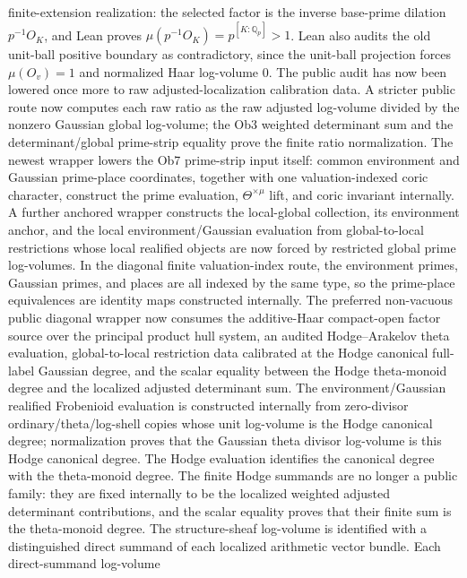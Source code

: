\begin{proposition}
  finite-extension realization: the selected factor is the inverse base-prime
  dilation \(p^{-1}O_K\), and Lean proves
  \(\mu(p^{-1}O_K)=p^{[K:\mathbb Q_p]}>1\).  Lean also audits the old unit-ball
  positive boundary as contradictory, since the unit-ball projection forces
  \(\mu(O_v)=1\) and normalized Haar log-volume \(0\).  The public audit has now
  been lowered once more
  to raw adjusted-localization calibration data.  A stricter public route now
  computes each raw ratio as the raw adjusted log-volume divided by the nonzero
  Gaussian global log-volume; the Ob3 weighted determinant sum and the
  determinant/global prime-strip equality prove the finite ratio normalization.
  The newest wrapper lowers the Ob7 prime-strip input itself: common
  environment and Gaussian prime-place coordinates, together with one
  valuation-indexed coric character, construct the prime evaluation,
  \(\Theta^{\times\mu}\) lift, and coric invariant internally.
  A further anchored wrapper constructs the local-global collection, its
  environment anchor, and the local environment/Gaussian evaluation from
  global-to-local restrictions whose local realified objects are now forced by
  restricted global prime log-volumes.  In the diagonal finite valuation-index
  route, the environment primes, Gaussian primes, and places are all indexed
  by the same type, so the prime-place equivalences are identity maps
  constructed internally.  The preferred non-vacuous public diagonal wrapper
  now consumes the additive-Haar compact-open factor source over the principal
  product hull system, an audited Hodge--Arakelov theta
  evaluation, global-to-local restriction data calibrated at the Hodge
  canonical full-label Gaussian degree, and the scalar equality between the
  Hodge theta-monoid degree and the localized adjusted determinant sum.  The
  environment/Gaussian realified Frobenioid evaluation is constructed
  internally from zero-divisor ordinary/theta/log-shell copies whose unit
  log-volume is the Hodge canonical degree; normalization proves that the
  Gaussian theta divisor log-volume is this Hodge canonical degree.  The Hodge
  evaluation identifies the canonical degree with the theta-monoid degree.  The
  finite Hodge summands are no longer a public family: they are fixed
  internally to be the localized weighted adjusted determinant contributions,
  and the scalar equality proves that their finite sum is the theta-monoid
  degree.  The
  structure-sheaf log-volume is identified with a distinguished direct summand
  of each localized arithmetic vector bundle.  Each direct-summand log-volume

\end{proposition}
